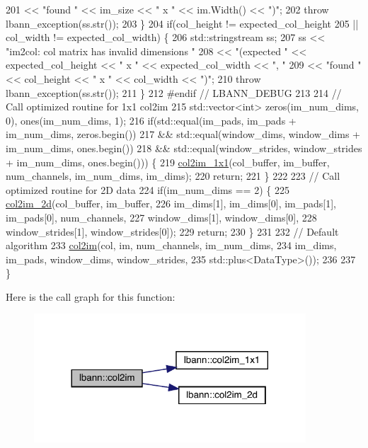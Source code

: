 \begin{DoxyCode}
201        << \textcolor{stringliteral}{"found "} << im\_size << \textcolor{stringliteral}{" x "} << im.Width() << \textcolor{stringliteral}{")"};
202     \textcolor{keywordflow}{throw} lbann\_exception(ss.str());
203   \}
204   \textcolor{keywordflow}{if}(col\_height != expected\_col\_height
205      || col\_width != expected\_col\_width) \{
206     std::stringstream ss;
207     ss << \textcolor{stringliteral}{"im2col: col matrix has invalid dimensions "}
208        << \textcolor{stringliteral}{"(expected "} << expected\_col\_height << \textcolor{stringliteral}{" x "} << expected\_col\_width << \textcolor{stringliteral}{", "}
209        << \textcolor{stringliteral}{"found "} << col\_height << \textcolor{stringliteral}{" x "} << col\_width << \textcolor{stringliteral}{")"};
210     \textcolor{keywordflow}{throw} lbann\_exception(ss.str());
211   \}
212 \textcolor{preprocessor}{  #endif // LBANN\_DEBUG  }
213 
214   \textcolor{comment}{// Call optimized routine for 1x1 col2im}
215   std::vector<int> zeros(im\_num\_dims, 0), ones(im\_num\_dims, 1);
216   \textcolor{keywordflow}{if}(std::equal(im\_pads, im\_pads + im\_num\_dims, zeros.begin())
217      && std::equal(window\_dims, window\_dims + im\_num\_dims, ones.begin())
218      && std::equal(window\_strides, window\_strides + im\_num\_dims, ones.begin())) \{
219     \hyperlink{namespacelbann_ab4fccda3dc4c2c293d643815dfefe22a}{col2im\_1x1}(col\_buffer, im\_buffer, num\_channels, im\_num\_dims, im\_dims);
220     \textcolor{keywordflow}{return};
221   \}
222 
223   \textcolor{comment}{// Call optimized routine for 2D data}
224   \textcolor{keywordflow}{if}(im\_num\_dims == 2) \{
225     \hyperlink{namespacelbann_a1953674a43b284f0abb5c5e4db94b2b9}{col2im\_2d}(col\_buffer, im\_buffer,
226               im\_dims[1], im\_dims[0], im\_pads[1], im\_pads[0], num\_channels,
227               window\_dims[1], window\_dims[0],
228               window\_strides[1], window\_strides[0]);
229     \textcolor{keywordflow}{return};
230   \}
231 
232   \textcolor{comment}{// Default algorithm}
233   \hyperlink{namespacelbann_ab36806d08e7c852ad9cf3a0564f29b64}{col2im}(col, im, num\_channels, im\_num\_dims,
234          im\_dims, im\_pads, window\_dims, window\_strides,
235          std::plus<DataType>());
236 
237 \}
\end{DoxyCode}
Here is the call graph for this function\+:\nopagebreak
\begin{figure}[H]
\begin{center}
\leavevmode
\includegraphics[width=288pt]{namespacelbann_a0e1225f72580ffb5166181392b68b651_cgraph}
\end{center}
\end{figure}
